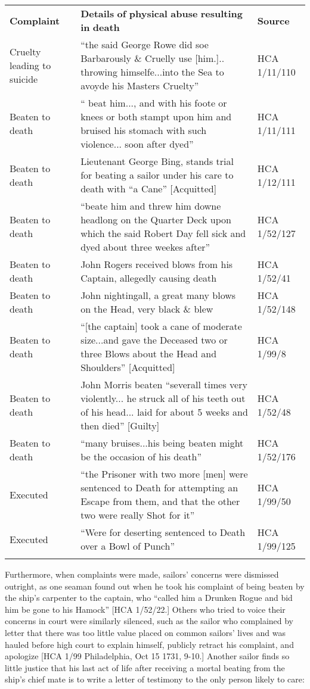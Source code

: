 \tabletail{}
\tablelasttail{}
\begin{tabularx}{\textwidth}{XXX}

\lsptoprule

\textbf{Complaint} & \textbf{Details} \textbf{of} \textbf{physical} \textbf{abuse} \textbf{resulting} \textbf{in} \textbf{death} & \textbf{Source}\\
Cruelty leading to suicide & “the said George Rowe did soe Barbarously \& Cruelly use [him.].. throwing himselfe...into the Sea to avoyde his Masters Cruelty” & HCA 1/11/110\\
Beaten to death & “ beat him..., and with his foote or knees or both stampt upon him and bruised his stomach with such violence... soon after dyed” & HCA 1/11/111\\
Beaten to death & Lieutenant George Bing, stands trial for beating a sailor under his care to death with “a Cane” [Acquitted] & HCA 1/12/111\\
Beaten to death & “beate him and threw him downe headlong on the Quarter Deck upon which the said Robert Day fell sick and dyed about three weekes after” & HCA 1/52/127\\
Beaten to death & John Rogers received blows from his Captain, allegedly causing death & HCA 1/52/41\\
Beaten to death & John nightingall, a great many blows on the Head, very black \& blew & HCA 1/52/148\\
Beaten to death & “[the captain] took a cane of  moderate size...and gave the Deceased two or three Blows about the Head and Shoulders” [Acquitted] & HCA 1/99/8\\
Beaten to death & John Morris beaten “severall times very violently... he struck all of his teeth out of his head... laid for about 5 weeks and then died” [Guilty] & HCA 1/52/48\\
Beaten to death & “many bruises...his being beaten might be the occasion of his death” & HCA 1/52/176\\
Executed & “the Prisoner with two more [men] were sentenced to Death for attempting an Escape from them, and that the other two were really Shot for it” & HCA 1/99/50\\
Executed & “Were for deserting sentenced to Death over a Bowl of Punch” & HCA 1/99/125\\
\lspbottomrule
\end{tabularx}
Furthermore, when complaints were made, sailors’ concerns were dismissed outright, as one seaman found out when he took his complaint of being beaten by the ship’s carpenter to the captain, who “called him a Drunken Rogue and bid him be gone to his Hamock” [HCA 1/52/22.] Others who tried to voice their concerns in court were similarly silenced, such as the sailor who complained by letter that there was too little value placed on common sailors’ lives and was hauled before high court to explain himself, publicly retract his complaint, and apologize [HCA 1/99 Philadelphia, Oct 15 1731, 9-10.] Another sailor finds so little justice that his last act of life after receiving a mortal beating from the ship’s chief mate is to write a letter of testimony to the only person likely to care:

